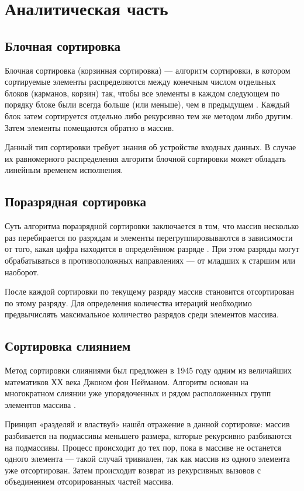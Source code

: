 \chapter{Аналитическая часть}

\section{Блочная сортировка}

Блочная сортировка (корзинная сортировка) --- алгоритм сортировки, в котором сортируемые элементы распределяются между конечным числом отдельных блоков (карманов, корзин) так, чтобы все элементы в каждом следующем по порядку блоке были всегда больше
(или меньше), чем в предыдущем \cite{Theory}. 
Каждый блок затем сортируется отдельно либо рекурсивно тем же методом либо другим. Затем элементы помещаются обратно в массив.

Данный тип сортировки требует знания об устройстве входных данных. 
В случае их равномерного распределения алгоритм блочной сортировки может обладать линейным временем исполнения.

\section{Поразрядная сортировка}

Суть алгоритма поразрядной сортировки заключается в том, что массив несколько раз перебирается по разрядам и элементы перегруппировываются в зависимости от того, какая цифра находится в определённом разряде \cite{RadixTh}. 
При этом разряды могут обрабатываться в противоположных направлениях — от младших к старшим или наоборот.

После каждой сортировки по текущему разряду массив становится отсортирован по этому разряду. 
Для определения количества итераций необходимо предвычислять максимальное количество разрядов среди элементов массива.

\section{Сортировка слиянием}

Метод сортировки слияниями был предложен в 1945 году одним из величайших математиков ХХ века Джоном фон Нейманом.
Алгоритм основан на многократном слиянии уже упорядоченных и рядом расположенных групп элементов массива \cite{Merge}. 

Принцип «разделяй и властвуй» нашёл отражение в данной сортировке: массив разбивается на подмассивы меньшего размера, которые рекурсивно разбиваются на подмассивы. 
Процесс происходит до тех пор, пока в массиве не останется одного элемента --- такой случай тривиален, так как массив из одного элемента уже отсортирован. Затем происходит возврат из рекурсивных вызовов с объединением отсорированных частей массива.

